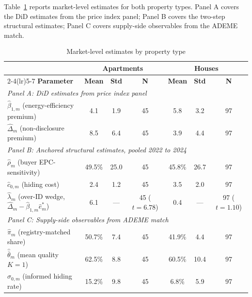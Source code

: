 Table~\ref{tab:did_results} reports market-level estimates for both property types. Panel A covers the DiD estimates from the price index panel; Panel B covers the two-step structural estimates; Panel C covers supply-side observables from the ADEME match.

\begin{table}[t]
\centering
\caption{Market-level estimates by property type}
\label{tab:did_results}
\small\renewcommand{\arraystretch}{1.3}
\begin{tabular*}{\textwidth}{@{\extracolsep{\fill}}l*{6}{c}@{}}
\toprule\toprule
 & \multicolumn{3}{c}{\textbf{Apartments}} & \multicolumn{3}{c}{\textbf{Houses}} \\
\cmidrule(lr){2-4}\cmidrule(lr){5-7}
\textbf{Parameter} & \textbf{Mean} & \textbf{Std} & \textbf{N} & \textbf{Mean} & \textbf{Std} & \textbf{N} \\
\midrule
\multicolumn{7}{l}{\textit{Panel A: DiD estimates from price index panel}} \\[2pt]
$\hat\beta_{1,m}$ (energy-efficiency premium) & 4.1 & 1.9 & 45  & 5.8 & 3.2 & 97 \\
$\hat\Delta_m$ (non-disclosure premium)       & 8.5 & 6.4 & 45  & 3.9 & 4.4 & 97 \\
\midrule
\multicolumn{7}{l}{\textit{Panel B: Anchored structural estimates, pooled 2022 to 2024}} \\[2pt]
$\hat\rho_m$ (buyer EPC-sensitivity)          & 49.5\% & 25.0 & 45 & 45.8\% & 26.7 & 97 \\
$\hat c_{0,m}$ (hiding cost)                  &  2.4 &  1.2 & 45 &  3.5 &  2.0 & 97 \\
$\hat\lambda_m$ (over-ID wedge, $\hat\Delta_m-\hat\beta_{1,m}\hat e^*_m$) & 6.1 & --- & 45 ($t=6.78$) & 0.4 & --- & 97 ($t=1.10$) \\
\midrule
\multicolumn{7}{l}{\textit{Panel C: Supply-side observables from ADEME match}} \\[2pt]
$\hat\pi_m$ (registry-matched share)          & 50.7\% &  7.4 & 45 & 41.9\% &  4.4 & 97 \\
$\hat{\bar\theta}_m$ (mean quality $K{=}1$)   & 62.5\% &  8.8 & 45 & 60.5\% & 10.4 & 97 \\
$\hat\sigma_{0,m}$ (informed hiding rate)     & 15.2\% &  9.8 & 45 &  6.8\% &  5.9 & 97 \\
\bottomrule\bottomrule
\end{tabular*}
\vspace{0.5em}
\begin{minipage}{\linewidth}

\end{minipage}
\end{table}
